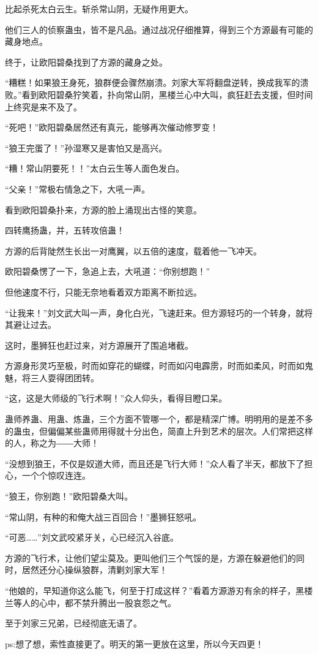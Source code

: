 \begin{this_body}
比起杀死太白云生。斩杀常山阴，无疑作用更大。

他们三人的侦察蛊虫，皆不是凡品。通过战况仔细推算，得到三个方源最有可能的藏身地点。

终于，让欧阳碧桑找到了方源的藏身之处。

“糟糕！如果狼王身死，狼群便会骤然崩溃。刘家大军将翻盘逆转，换成我军的溃败。”看到欧阳碧桑狞笑着，扑向常山阴，黑楼兰心中大叫，疯狂赶去支援，但时间上终究是来不及了。

“死吧！”欧阳碧桑居然还有真元，能够再次催动修罗变！

“狼王完蛋了！”孙湿寒又是害怕又是高兴。

“糟！常山阴要死！！”太白云生等人面色发白。

“父亲！”常极右情急之下，大吼一声。

看到欧阳碧桑扑来，方源的脸上涌现出古怪的笑意。

四转鹰扬蛊，并，五转攻倍蛊！

方源的后背陡然生长出一对鹰翼，以五倍的速度，载着他一飞冲天。

欧阳碧桑愣了一下，急追上去，大吼道：“你别想跑！”

但他速度不行，只能无奈地看着双方距离不断拉远。

“让我来！”刘文武大叫一声，身化白光，飞速赶来。但方源轻巧的一个转身，就将其避让过去。

这时，墨狮狂也赶过来，对方源展开了围追堵截。

方源身形灵巧至极，时而如穿花的蝴蝶，时而如闪电霹雳，时而如柔风，时而如鬼魅，将三人耍得团团转。

“这，这是大师级的飞行术啊！”众人仰头，看得目瞪口呆。

蛊师养蛊、用蛊、炼蛊，三个方面不管哪一个，都是精深广博。明明用的是差不多的蛊虫，但偏偏某些蛊师用得就十分出色，简直上升到艺术的层次。人们常把这样的人，称之为――大师！

“没想到狼王，不仅是奴道大师，而且还是飞行大师！”众人看了半天，都放下了担心，一个个惊叹连连。

“狼王，你别跑！”欧阳碧桑大叫。

“常山阴，有种的和俺大战三百回合！”墨狮狂怒吼。

“可恶……”刘文武咬紧牙关，心已经沉入谷底。

方源的飞行术，让他们望尘莫及。更叫他们三个气馁的是，方源在躲避他们的同时，居然还分心操纵狼群，清剿刘家大军！

“他娘的，早知道你这么能飞，何至于打成这样？”看着方源游刃有余的样子，黑楼兰等人的心中，都不禁升腾出一股哀怨之气。

至于刘家三兄弟，已经彻底无语了。

ps:想了想，索性直接更了。明天的第一更放在这里，所以今天四更！

\end{this_body}


